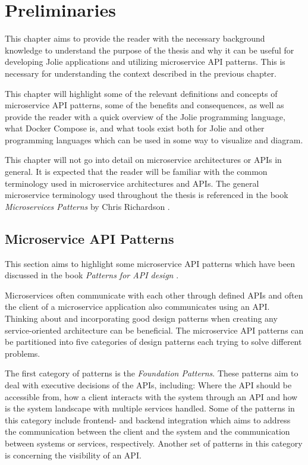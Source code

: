 \chapter{Preliminaries}
This chapter aims to provide the reader with the necessary background knowledge
to understand the purpose of the thesis and why it can be useful for developing Jolie applications and utilizing
microservice API patterns. This is necessary for understanding the context described in the previous chapter.

This chapter will highlight some of the relevant definitions and concepts of microservice API patterns, some of the benefits and consequences, as
 well as provide
the reader with a quick overview of the Jolie programming language,
what Docker Compose is, and what tools exist both for Jolie and
other programming languages which can be used in some way to visualize and diagram.

This chapter will not go into detail on microservice architectures or APIs in general. It is
expected that the reader will be familiar with the common terminology used in microservice architectures and APIs.
The general microservice terminology used throughout the thesis is referenced in the book \emph{Microservices Patterns} by Chris Richardson \cite{microservicepatterns}.

\section{Microservice API Patterns}
This section aims to highlight some microservice API patterns which have been discussed in the book \emph{Patterns for API design} \cite{PatternsForAPIDesign:2022}.

Microservices often communicate with each other through defined APIs and often the client of a microservice application also communicates using an API.
Thinking about and incorporating good design patterns when creating any service-oriented architecture can be beneficial.
The microservice API patterns can be partitioned into five categories of design patterns each trying to solve different problems.

The first category of patterns is the \emph{Foundation Patterns}. These patterns aim to deal with executive decisions of the APIs, including: Where the API should be
accessible from, how a client interacts with the system through an API and how is the system landscape with multiple services handled. Some of the patterns in this category include frontend- and backend integration which aims
to address the communication between the client and the system and the communication between systems or services, respectively. Another set of patterns in this category is concerning the visibility of an API.

